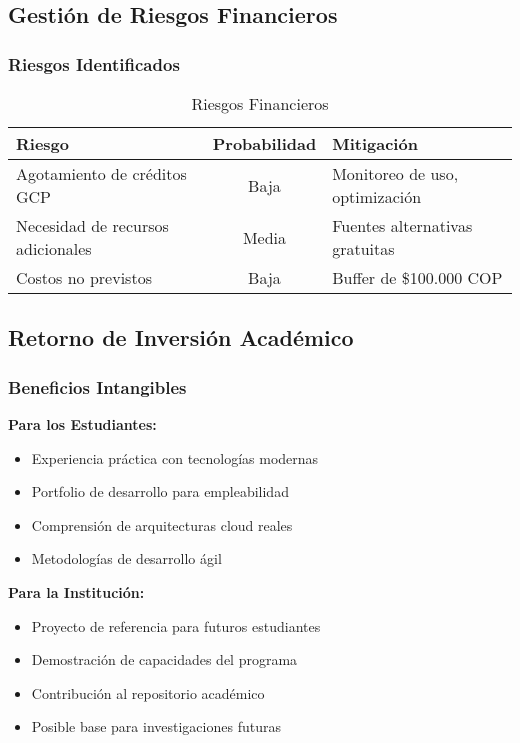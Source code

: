 \subsection{Gestión de Riesgos Financieros}

\subsubsection{Riesgos Identificados}

\begin{table}[H]
    \centering
    \small
    \begin{tabular}{|l|c|l|}
        \hline
        \textbf{Riesgo} & \textbf{Probabilidad} & \textbf{Mitigación} \\
        \hline
        Agotamiento de créditos GCP & Baja & Monitoreo de uso, optimización \\
        \hline
        Necesidad de recursos adicionales & Media & Fuentes alternativas gratuitas \\
        \hline
        Costos no previstos & Baja & Buffer de \$100.000 COP \\
        \hline
    \end{tabular}
    \caption{Riesgos Financieros}
    \label{tab:riesgos_financieros}
\end{table}

\subsection{Retorno de Inversión Académico}

\subsubsection{Beneficios Intangibles}

\textbf{Para los Estudiantes:}
\begin{itemize}
    \item Experiencia práctica con tecnologías modernas
    \item Portfolio de desarrollo para empleabilidad
    \item Comprensión de arquitecturas cloud reales
    \item Metodologías de desarrollo ágil
\end{itemize}

\textbf{Para la Institución:}
\begin{itemize}
    \item Proyecto de referencia para futuros estudiantes
    \item Demostración de capacidades del programa
    \item Contribución al repositorio académico
    \item Posible base para investigaciones futuras
\end{itemize}

